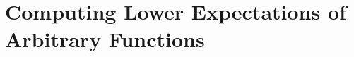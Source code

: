 \documentclass[10pt,a4paper]{paper}
\theoremstyle{definition}
\newcommand{\states}{\mathcal{X}}
\newcommand{\processes}{\mathbb{P}}
\newcommand{\wprocesses}{\processes^{\mathrm{W}}}
\newcommand{\gambles}{\mathcal{L}}
\newcommand{\rateset}{\mathcal{Q}}
\newcommand{\lrate}{\underline{Q}}
\newcommand{\coloneqq}{:\!=}
\begin{document}
%
%
%

\section{Computing Lower Expectations of Arbitrary Functions}\label{sec:funcs_multi_time_points}

\end{document}
